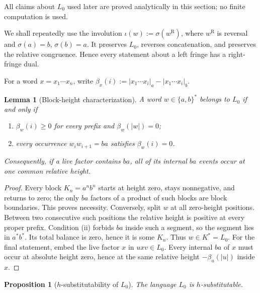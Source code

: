 \documentclass[11pt,a4paper]{article}
\newtheorem{lemma}[theorem]{Lemma}
\newtheorem{proposition}[theorem]{Proposition}
\begin{document}
All claims about $L_0$ used later are proved analytically in this
section; no finite computation is used.

We shall repeatedly use the involution
\(\iota(w):=\sigma(w^{\mathrm R})\), where $w^{\mathrm R}$ is reversal
and $\sigma(a)=b$, $\sigma(b)=a$.  It preserves $L_0$, reverses
concatenation, and preserves the relative congruence.  Hence every
statement about a left fringe has a right-fringe dual.

For a word $x=x_1\cdots x_n$, write
\(\beta_x(i):=|x_1\cdots x_i|_a-|x_1\cdots x_i|_b.\)
\begin{lemma}[Block-height characterization]
\label{lem:L0-height-characterization}
A word $w\in\{a,b\}^*$ belongs to $L_0$ if and only if
\begin{enumerate}[label=\textup{(\roman*)},nosep]
\item $\beta_w(i)\ge0$ for every prefix and $\beta_w(|w|)=0$;
\item every occurrence $w_iw_{i+1}=ba$ satisfies $\beta_w(i)=0$.
\end{enumerate}
Consequently, if a live factor contains $ba$, all of its internal
$ba$ events occur at one common relative height.
\end{lemma}

\begin{proof}
Every block $K_n=a^nb^n$ starts at height zero, stays nonnegative, and
returns to zero; the only $ba$ factors of a product of such blocks are
block boundaries.  This proves necessity.  Conversely, split $w$ at
all zero-height positions.  Between two consecutive such positions the
relative height is positive at every proper prefix.  Condition
\textup{(ii)} forbids $ba$ inside such a segment, so the segment lies in
$a^*b^*$.  Its total balance is zero, hence it is some $K_n$.  Thus
$w\in K^*=L_0$.  For the final statement, embed the live factor $x$ in
$uxv\in L_0$.  Every internal $ba$ of $x$ must occur at absolute height
zero, hence at the same relative height $-\beta_u(|u|)$ inside $x$.
\end{proof}

\begin{proposition}[$h$-substitutability of $L_0$]
\label{prop:L0-h-substitutable}
The language $L_0$ is $h$-substitutable.
\end{proposition}
\end{document}
